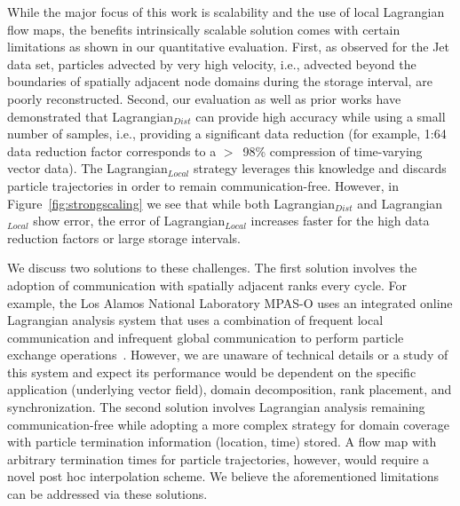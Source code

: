 While the major focus of this work is scalability and the use of local Lagrangian flow maps, the benefits intrinsically scalable solution comes with certain limitations as shown in our quantitative evaluation.
%
First, as observed for the Jet data set, particles advected by very high velocity, i.e., advected beyond the boundaries of spatially adjacent node domains during the storage interval, are poorly reconstructed.
%
%
Second, our evaluation as well as prior works have demonstrated that Lagrangian$_{Dist}$ can provide high accuracy while using a small number of samples, i.e., providing a significant data reduction (for example, 1:64 data reduction factor corresponds to a $>$~98\% compression of time-varying vector data).
%
The Lagrangian$_{Local}$ strategy leverages this knowledge and discards particle trajectories in order to remain communication-free.
%
However, in Figure~\ref{fig:strongscaling} we see that while both Lagrangian$_{Dist}$ and Lagrangian$_{Local}$ show error, the error of Lagrangian$_{Local}$ increases faster for the high data reduction factors or large storage intervals.
%

We discuss two solutions to these challenges.
%
The first solution involves the adoption of communication with spatially adjacent ranks every cycle.
%
For example, the Los Alamos National Laboratory MPAS-O uses an integrated online Lagrangian analysis system that uses a combination of frequent local communication and infrequent global communication to perform particle exchange operations~\cite{VANSEBILLE201849}.
%
However, we are unaware of technical details or a study of this system and expect its performance would be dependent on the specific application (underlying vector field), domain decomposition, rank placement, and synchronization.
%
The second solution involves Lagrangian analysis remaining communication-free while adopting a more complex strategy for domain coverage with particle termination information (location, time) stored.
%
A flow map with arbitrary termination times for particle trajectories, however, would require a novel post hoc interpolation scheme.
%
We believe the aforementioned limitations can be addressed via these solutions.
